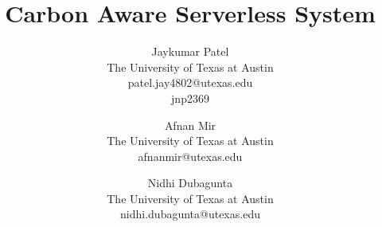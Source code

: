 \documentclass[times, 10pt,twocolumn]{article}
\begin{document}
\title{Carbon Aware Serverless System}

\author{Jaykumar Patel\\
The University of Texas at Austin\\
patel.jay4802@utexas.edu\\
jnp2369\\
\and
Afnan Mir\\
The University of Texas at Austin\\
afnanmir@utexas.edu\\
\and
Nidhi Dubagunta\\
The University of Texas at Austin\\
nidhi.dubagunta@utexas.edu
}



\maketitle
\thispagestyle{empty}
\end{document}
